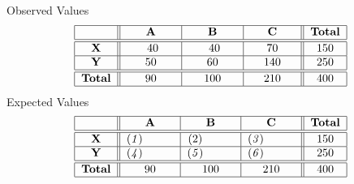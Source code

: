\documentclass{beamer}
\begin{document}
\begin{frame}
\Large
Observed Values
\[	
\begin{tabular}{|c||c|c|c||c|} \hline
	&	\textbf{A}	&	\textbf{B}	&	\textbf{C}	&	\textbf{Total}	\\ \hline \hline 
	\textbf{X}	&\phantom{spa}	40\phantom{spa}	&\phantom{spa}	40\phantom{spa}	&	\phantom{spa}70\phantom{spa}	&	150	\\ \hline
	\textbf{Y}	&	50	&	60	&	140	&	250	\\ \hline \hline
	\textbf{Total}&	90	&	100	&	210	&	400	\\ \hline
\end{tabular}
\]
Expected Values
\[	
\begin{tabular}{|c||c|c|c||c|} \hline
	&	\textbf{A}	&	\textbf{B}	&	\textbf{C}	&	\textbf{Total}	\\ \hline \hline
	\textbf{X}	&(\textit{1})\phantom{spaces}		&(2)\phantom{spaces}		&(\textit{3})\phantom{spaces}		&	150	\\ \hline
	\textbf{Y}	&(\textit{4})\phantom{spaces}		&(\textit{5})\phantom{spaces}		&(\textit{6})\phantom{spaces}		&	250	\\ \hline \hline
	\textbf{Total} &	90	&	100	&	210	&	400	\\ \hline
\end{tabular}
\]
\end{frame}
\phantom{space}
\end{document}
